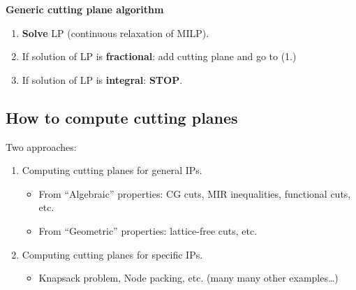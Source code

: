\begin{multicols}{2}

{\bf Generic cutting plane algorithm}

\vspace{-1cm}

\begin{enumerate}
\setlength{\itemsep}{0.01cm}
\item {\bf  Solve} LP (continuous relaxation of MILP).
\item If solution of LP is {\bf  fractional}: add cutting plane and go to (1.)
\item If solution of LP is {\bf integral}: { \bf STOP}.
\end{enumerate}

\columnbreak

\begin{center}
\end{center}

\end{multicols}

\vspace{-1cm}

\subsection{How to compute cutting planes}

Two approaches:

\begin{enumerate}
	\item Computing cutting planes for general IPs.
	\begin{itemize}
		\item From ``Algebraic'' properties: CG cuts, MIR inequalities, functional cuts, etc.
		\item From ``Geometric'' properties: lattice-free cuts, etc.
	\end{itemize}
	
		\item Computing cutting planes for specific IPs.
	\begin{itemize}
		\item Knapsack problem, Node packing, etc. (many many other examples\dots)
	\end{itemize}
\end{enumerate}



